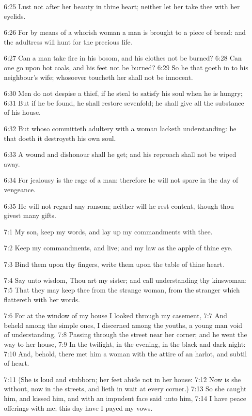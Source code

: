6:25 Lust not after her beauty in thine heart; neither let her take thee with her eyelids.

6:26 For by means of a whorish woman a man is brought to a piece of bread: and the adultress will hunt for the precious life.

6:27 Can a man take fire in his bosom, and his clothes not be burned?  6:28 Can one go upon hot coals, and his feet not be burned?  6:29 So he that goeth in to his neighbour's wife; whosoever toucheth her shall not be innocent.

6:30 Men do not despise a thief, if he steal to satisfy his soul when he is hungry; 6:31 But if he be found, he shall restore sevenfold; he shall give all the substance of his house.

6:32 But whoso committeth adultery with a woman lacketh understanding: he that doeth it destroyeth his own soul.

6:33 A wound and dishonour shall he get; and his reproach shall not be wiped away.

6:34 For jealousy is the rage of a man: therefore he will not spare in the day of vengeance.

6:35 He will not regard any ransom; neither will he rest content, though thou givest many gifts.

7:1 My son, keep my words, and lay up my commandments with thee.

7:2 Keep my commandments, and live; and my law as the apple of thine eye.

7:3 Bind them upon thy fingers, write them upon the table of thine heart.

7:4 Say unto wisdom, Thou art my sister; and call understanding thy kinswoman: 7:5 That they may keep thee from the strange woman, from the stranger which flattereth with her words.

7:6 For at the window of my house I looked through my casement, 7:7 And beheld among the simple ones, I discerned among the youths, a young man void of understanding, 7:8 Passing through the street near her corner; and he went the way to her house, 7:9 In the twilight, in the evening, in the black and dark night: 7:10 And, behold, there met him a woman with the attire of an harlot, and subtil of heart.

7:11 (She is loud and stubborn; her feet abide not in her house: 7:12 Now is she without, now in the streets, and lieth in wait at every corner.)  7:13 So she caught him, and kissed him, and with an impudent face said unto him, 7:14 I have peace offerings with me; this day have I payed my vows.

